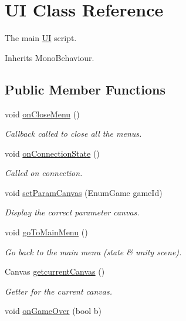 \hypertarget{class_u_i}{\section{U\-I Class Reference}
\label{class_u_i}
}


The main \hyperlink{class_u_i}{U\-I} script. 




Inherits Mono\-Behaviour.

\subsection*{Public Member Functions}
\begin{DoxyCompactItemize}
\item 
void \hyperlink{class_u_i_a175cc333147530da7ff67fa4605a7e8e}{on\-Close\-Menu} ()
\begin{DoxyCompactList}\small\item\em Callback called to close all the menus.\end{DoxyCompactList}\item 
void \hyperlink{class_u_i_a35e47ccba6a7038fc37435692775ffa1}{on\-Connection\-State} ()
\begin{DoxyCompactList}\small\item\em Called on connection.\end{DoxyCompactList}\item 
void \hyperlink{class_u_i_ae6e969c28d9e2f5e57db40a1a3e0edb0}{set\-Param\-Canvas} (Enum\-Game game\-Id)
\begin{DoxyCompactList}\small\item\em Display the correct parameter canvas.\end{DoxyCompactList}\item 
void \hyperlink{class_u_i_a6fb1ac66925d006ea5d8943722c7a276}{go\-To\-Main\-Menu} ()
\begin{DoxyCompactList}\small\item\em Go back to the main menu (state \& unity scene).\end{DoxyCompactList}\item 
Canvas \hyperlink{class_u_i_ae51febf7bdea895d39cb661a16f5f2da}{getcurrent\-Canvas} ()
\begin{DoxyCompactList}\small\item\em Getter for the current canvas.\end{DoxyCompactList}\item 
void \hyperlink{class_u_i_ac7ebb4a32a8726ed4cfc5ae5ef1b5e8e}{on\-Game\-Over} (bool b)

\end{DoxyCompactItemize}
